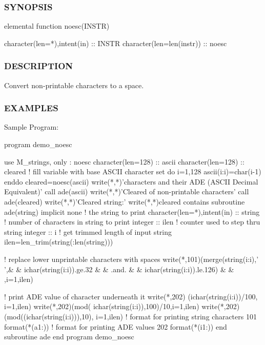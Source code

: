 \subsubsection*{S\+Y\+N\+O\+P\+S\+IS}

\begin{DoxyVerb}elemental function noesc(INSTR)

 character(len=*),intent(in) :: INSTR
 character(len=len(instr))   :: noesc
\end{DoxyVerb}
 \subsubsection*{D\+E\+S\+C\+R\+I\+P\+T\+I\+ON}

Convert non-\/printable characters to a space.

\subsubsection*{E\+X\+A\+M\+P\+L\+ES}

Sample Program\+: \begin{DoxyVerb}program demo_noesc

use M_strings, only : noesc
character(len=128) :: ascii
character(len=128) :: cleared
! fill variable with base ASCII character set
do i=1,128
   ascii(i:i)=char(i-1)
enddo
cleared=noesc(ascii)
write(*,*)'characters and their ADE (ASCII Decimal Equivalent)'
call ade(ascii)
write(*,*)'Cleared of non-printable characters'
call ade(cleared)
write(*,*)'Cleared string:'
write(*,*)cleared
contains
  subroutine ade(string)
  implicit none
  ! the string to print
  character(len=*),intent(in) :: string
  ! number of characters in string to print
  integer :: ilen
  ! counter used to step thru string
  integer :: i
     ! get trimmed length of input string
     ilen=len_trim(string(:len(string)))

     ! replace lower unprintable characters with spaces
     write(*,101)(merge(string(i:i),' ',&
     & ichar(string(i:i)).ge.32         &
     & .and.                            &
     & ichar(string(i:i)).le.126)       &
     & ,i=1,ilen)

     ! print ADE value of character underneath it
     write(*,202)     (ichar(string(i:i))/100,    i=1,ilen)
     write(*,202)(mod( ichar(string(i:i)),100)/10,i=1,ilen)
     write(*,202)(mod((ichar(string(i:i))),10),   i=1,ilen)
  ! format for printing string characters
  101   format(*(a1:))
  ! format for printing ADE values
  202   format(*(i1:))
  end subroutine ade
  end program demo_noesc
\end{DoxyVerb}


